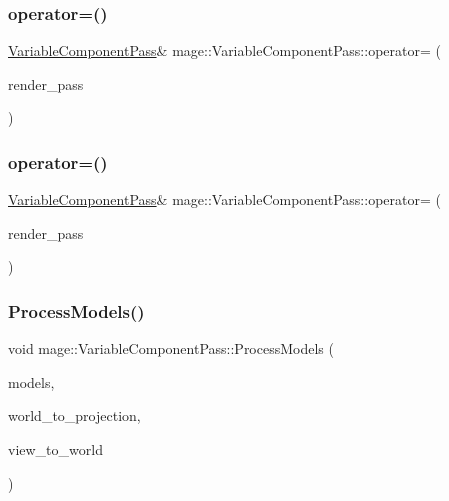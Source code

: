 \subsubsection{\texorpdfstring{operator=()}{operator=()}\hspace{0.1cm}{\footnotesize\ttfamily [1/2]}}
{\footnotesize\ttfamily \hyperlink{classmage_1_1_variable_component_pass}{Variable\+Component\+Pass}\& mage\+::\+Variable\+Component\+Pass\+::operator= (\begin{DoxyParamCaption}\item[{const \hyperlink{classmage_1_1_variable_component_pass}{Variable\+Component\+Pass} \&}]{render\+\_\+pass }\end{DoxyParamCaption})\hspace{0.3cm}{\ttfamily [delete]}}

\hypertarget{classmage_1_1_variable_component_pass_ab4c2ccc632031ec51c16f7c9d500e427}{}\label{classmage_1_1_variable_component_pass_ab4c2ccc632031ec51c16f7c9d500e427} 
\subsubsection{\texorpdfstring{operator=()}{operator=()}\hspace{0.1cm}{\footnotesize\ttfamily [2/2]}}
{\footnotesize\ttfamily \hyperlink{classmage_1_1_variable_component_pass}{Variable\+Component\+Pass}\& mage\+::\+Variable\+Component\+Pass\+::operator= (\begin{DoxyParamCaption}\item[{\hyperlink{classmage_1_1_variable_component_pass}{Variable\+Component\+Pass} \&\&}]{render\+\_\+pass }\end{DoxyParamCaption})\hspace{0.3cm}{\ttfamily [delete]}}

\hypertarget{classmage_1_1_variable_component_pass_ac6aac234da2c7310f036e6a7e4df0afa}{}\label{classmage_1_1_variable_component_pass_ac6aac234da2c7310f036e6a7e4df0afa} 
\subsubsection{\texorpdfstring{Process\+Models()}{ProcessModels()}}
{\footnotesize\ttfamily void mage\+::\+Variable\+Component\+Pass\+::\+Process\+Models (\begin{DoxyParamCaption}\item[{const vector$<$ const \hyperlink{classmage_1_1_model_node}{Model\+Node} $\ast$ $>$ \&}]{models,  }\item[{F\+X\+M\+M\+A\+T\+R\+IX}]{world\+\_\+to\+\_\+projection,  }\item[{F\+X\+M\+M\+A\+T\+R\+IX}]{view\+\_\+to\+\_\+world }\end{DoxyParamCaption})\hspace{0.3cm}{\ttfamily [private]}}

